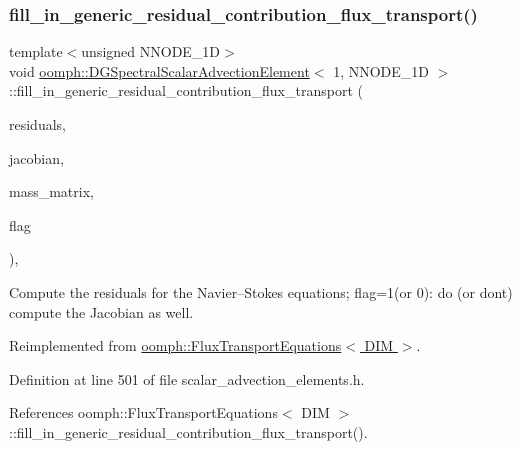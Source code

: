 \subsubsection{\texorpdfstring{fill\+\_\+in\+\_\+generic\+\_\+residual\+\_\+contribution\+\_\+flux\+\_\+transport()}{fill\_in\_generic\_residual\_contribution\_flux\_transport()}}
{\footnotesize\ttfamily template$<$unsigned N\+N\+O\+D\+E\+\_\+1D$>$ \\
void \hyperlink{classoomph_1_1DGSpectralScalarAdvectionElement}{oomph\+::\+D\+G\+Spectral\+Scalar\+Advection\+Element}$<$ 1, N\+N\+O\+D\+E\+\_\+1D $>$\+::fill\+\_\+in\+\_\+generic\+\_\+residual\+\_\+contribution\+\_\+flux\+\_\+transport (\begin{DoxyParamCaption}\item[{\hyperlink{classoomph_1_1Vector}{Vector}$<$ double $>$ \&}]{residuals,  }\item[{\hyperlink{classoomph_1_1DenseMatrix}{Dense\+Matrix}$<$ double $>$ \&}]{jacobian,  }\item[{\hyperlink{classoomph_1_1DenseMatrix}{Dense\+Matrix}$<$ double $>$ \&}]{mass\+\_\+matrix,  }\item[{unsigned}]{flag }\end{DoxyParamCaption})\hspace{0.3cm}{\ttfamily [inline]}, {\ttfamily [virtual]}}



Compute the residuals for the Navier--Stokes equations; flag=1(or 0)\+: do (or don\textquotesingle{}t) compute the Jacobian as well. 



Reimplemented from \hyperlink{classoomph_1_1FluxTransportEquations_a6994eab818eb7236e24e45b6fedec1f7}{oomph\+::\+Flux\+Transport\+Equations$<$ D\+I\+M $>$}.



Definition at line 501 of file scalar\+\_\+advection\+\_\+elements.\+h.



References oomph\+::\+Flux\+Transport\+Equations$<$ D\+I\+M $>$\+::fill\+\_\+in\+\_\+generic\+\_\+residual\+\_\+contribution\+\_\+flux\+\_\+transport().

\mbox{\label{classoomph_1_1DGSpectralScalarAdvectionElement_3_011_00_01NNODE__1D_01_4_af5e59ed30beabf17ae00ee64b19d8775}} 
